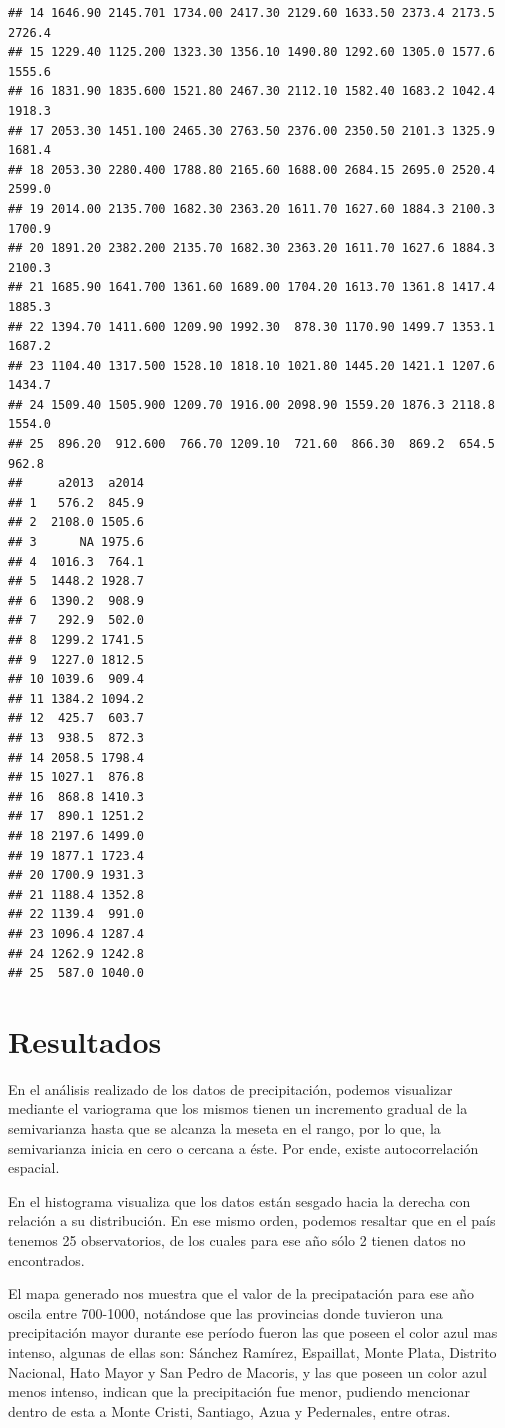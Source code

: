 \documentclass[11pt,]{article}
\begin{document}
\begin{verbatim}
## 14 1646.90 2145.701 1734.00 2417.30 2129.60 1633.50 2373.4 2173.5 2726.4
## 15 1229.40 1125.200 1323.30 1356.10 1490.80 1292.60 1305.0 1577.6 1555.6
## 16 1831.90 1835.600 1521.80 2467.30 2112.10 1582.40 1683.2 1042.4 1918.3
## 17 2053.30 1451.100 2465.30 2763.50 2376.00 2350.50 2101.3 1325.9 1681.4
## 18 2053.30 2280.400 1788.80 2165.60 1688.00 2684.15 2695.0 2520.4 2599.0
## 19 2014.00 2135.700 1682.30 2363.20 1611.70 1627.60 1884.3 2100.3 1700.9
## 20 1891.20 2382.200 2135.70 1682.30 2363.20 1611.70 1627.6 1884.3 2100.3
## 21 1685.90 1641.700 1361.60 1689.00 1704.20 1613.70 1361.8 1417.4 1885.3
## 22 1394.70 1411.600 1209.90 1992.30  878.30 1170.90 1499.7 1353.1 1687.2
## 23 1104.40 1317.500 1528.10 1818.10 1021.80 1445.20 1421.1 1207.6 1434.7
## 24 1509.40 1505.900 1209.70 1916.00 2098.90 1559.20 1876.3 2118.8 1554.0
## 25  896.20  912.600  766.70 1209.10  721.60  866.30  869.2  654.5  962.8
##     a2013  a2014
## 1   576.2  845.9
## 2  2108.0 1505.6
## 3      NA 1975.6
## 4  1016.3  764.1
## 5  1448.2 1928.7
## 6  1390.2  908.9
## 7   292.9  502.0
## 8  1299.2 1741.5
## 9  1227.0 1812.5
## 10 1039.6  909.4
## 11 1384.2 1094.2
## 12  425.7  603.7
## 13  938.5  872.3
## 14 2058.5 1798.4
## 15 1027.1  876.8
## 16  868.8 1410.3
## 17  890.1 1251.2
## 18 2197.6 1499.0
## 19 1877.1 1723.4
## 20 1700.9 1931.3
## 21 1188.4 1352.8
## 22 1139.4  991.0
## 23 1096.4 1287.4
## 24 1262.9 1242.8
## 25  587.0 1040.0
\end{verbatim}

\section{Resultados}\label{resultados}

En el análisis realizado de los datos de precipitación, podemos
visualizar mediante el variograma que los mismos tienen un incremento
gradual de la semivarianza hasta que se alcanza la meseta en el rango,
por lo que, la semivarianza inicia en cero o cercana a éste. Por ende,
existe autocorrelación espacial.

En el histograma visualiza que los datos están sesgado hacia la derecha
con relación a su distribución. En ese mismo orden, podemos resaltar que
en el país tenemos 25 observatorios, de los cuales para ese año sólo 2
tienen datos no encontrados.

El mapa generado nos muestra que el valor de la precipatación para ese
año oscila entre 700-1000, notándose que las provincias donde tuvieron
una precipitación mayor durante ese período fueron las que poseen el
color azul mas intenso, algunas de ellas son: Sánchez Ramírez,
Espaillat, Monte Plata, Distrito Nacional, Hato Mayor y San Pedro de
Macoris, y las que poseen un color azul menos intenso, indican que la
precipitación fue menor, pudiendo mencionar dentro de esta a Monte
Cristi, Santiago, Azua y Pedernales, entre otras.
\end{document}
